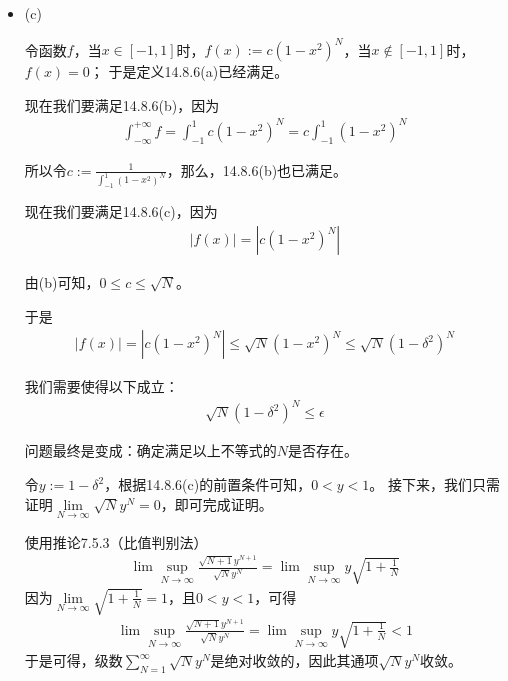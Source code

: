 \documentclass{article}
\begin{document}
\begin{itemize}
  \item (c)

        令函数$f$，当$x \in [-1, 1]$时，$f(x) := c(1-x^2)^N$，当$x \notin [-1, 1]$时，$f(x) = 0$；
        于是定义14.8.6(a)已经满足。

        现在我们要满足14.8.6(b)，因为
        \begin{align*}
          \int_{-\infty}^{+\infty} f = \int_{-1}^{1} c(1-x^2)^N = c \int_{-1}^{1} (1-x^2)^N
        \end{align*}

        所以令$c := \frac{1}{\int_{-1}^{1} (1-x^2)^N}$，那么，14.8.6(b)也已满足。

        现在我们要满足14.8.6(c)，因为
        \begin{align*}
          |f(x)| = |c(1-x^2)^N|
        \end{align*}

        由(b)可知，$0 \leq c \leq \sqrt{N}$。

        于是
        \begin{align*}
          |f(x)| = |c(1-x^2)^N| \leq \sqrt{N} (1-x^2)^N \leq \sqrt{N} (1-\delta^2)^N
        \end{align*}

        我们需要使得以下成立：
        \begin{align*}
          \sqrt{N} (1-\delta^2)^N \leq \epsilon
        \end{align*}

        问题最终是变成：确定满足以上不等式的$N$是否存在。

        令$y := 1 - \delta^2$，根据14.8.6(c)的前置条件可知，$0 < y < 1$。
        接下来，我们只需证明$\lim \limits_{N \to \infty} \sqrt{N} y^N = 0$，即可完成证明。

        使用推论7.5.3（比值判别法）
        \begin{align*}
          \lim \sup \limits_{N \to \infty} \frac{\sqrt{N+1} y^{N + 1}}{\sqrt{N} y^N}
          = \lim \sup \limits_{N \to \infty} y \sqrt{1 + \frac{1}{N}}
        \end{align*}
        因为$\lim\limits_{N \to \infty} \sqrt{1 + \frac{1}{N}} = 1$，且$0 < y < 1$，可得
        \begin{align*}
          \lim \sup \limits_{N \to \infty} \frac{\sqrt{N+1} y^{N + 1}}{\sqrt{N} y^N}
          = \lim \sup \limits_{N \to \infty} y \sqrt{1 + \frac{1}{N}}
          < 1
        \end{align*}
        于是可得，级数$\sum \limits_{N = 1}^{\infty} \sqrt{N} y^N$是绝对收敛的，因此其通项$\sqrt{N} y^N$收敛。

\end{itemize}
\end{document}
